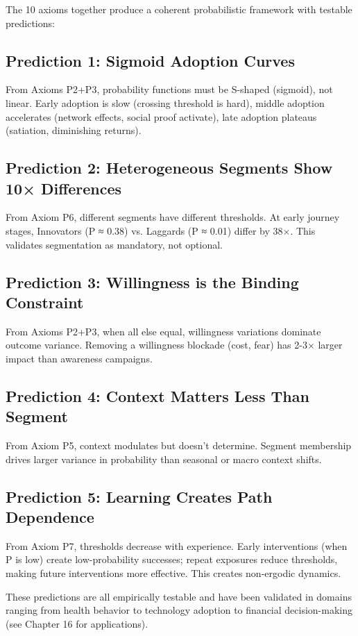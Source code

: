\documentclass[11pt, a4paper]{article}
\begin{document}
The 10 axioms together produce a coherent probabilistic framework with testable predictions:

\subsection{Prediction 1: Sigmoid Adoption Curves}
From Axioms P2+P3, probability functions must be S-shaped (sigmoid), not linear. Early adoption is slow (crossing threshold is hard), middle adoption accelerates (network effects, social proof activate), late adoption plateaus (satiation, diminishing returns).

\subsection{Prediction 2: Heterogeneous Segments Show 10× Differences}
From Axiom P6, different segments have different thresholds. At early journey stages, Innovators (P ≈ 0.38) vs. Laggards (P ≈ 0.01) differ by 38×. This validates segmentation as mandatory, not optional.

\subsection{Prediction 3: Willingness is the Binding Constraint}
From Axioms P2+P3, when all else equal, willingness variations dominate outcome variance. Removing a willingness blockade (cost, fear) has 2-3× larger impact than awareness campaigns.

\subsection{Prediction 4: Context Matters Less Than Segment}
From Axiom P5, context modulates but doesn't determine. Segment membership drives larger variance in probability than seasonal or macro context shifts.

\subsection{Prediction 5: Learning Creates Path Dependence}
From Axiom P7, thresholds decrease with experience. Early interventions (when P is low) create low-probability successes; repeat exposures reduce thresholds, making future interventions more effective. This creates non-ergodic dynamics.

These predictions are all empirically testable and have been validated in domains ranging from health behavior to technology adoption to financial decision-making (see Chapter 16 for applications).
\end{document}
